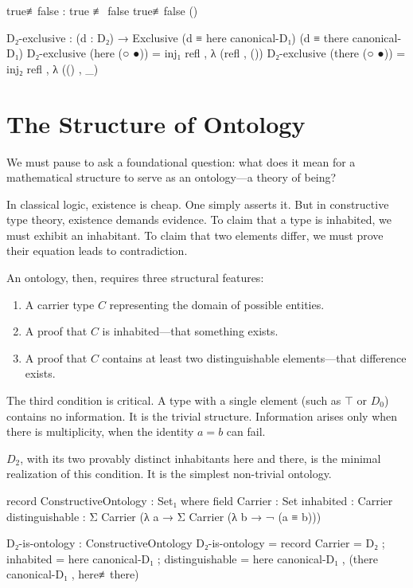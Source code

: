 \documentclass[11pt,a4paper]{book}
\def\texttt#1{#1}%
\begin{document}
\begin{code}
true≢false : true ≢ false
true≢false ()
\end{code}

\begin{code}
D₂-exclusive : (d : D₂) → Exclusive (d ≡ here canonical-D₁) (d ≡ there canonical-D₁)
D₂-exclusive (here (○ ●)) = inj₁ refl , λ { (refl , ()) }
D₂-exclusive (there (○ ●)) = inj₂ refl , λ { (() , _) }

\end{code}

\section{The Structure of Ontology}

We must pause to ask a foundational question: what does it mean for a mathematical 
structure to serve as an ontology—a theory of being?

In classical logic, existence is cheap. One simply asserts it. But in constructive 
type theory, existence demands evidence. To claim that a type is inhabited, we must 
exhibit an inhabitant. To claim that two elements differ, we must prove their 
equation leads to contradiction.

An ontology, then, requires three structural features:
\begin{enumerate}
\item A carrier type $C$ representing the domain of possible entities.
\item A proof that $C$ is inhabited—that something exists.
\item A proof that $C$ contains at least two distinguishable elements—that difference exists.
\end{enumerate}

The third condition is critical. A type with a single element (such as $\top$ or $D_0$) 
contains no information. It is the trivial structure. Information arises only when 
there is multiplicity, when the identity $a = b$ can fail.

$D_2$, with its two provably distinct inhabitants \texttt{here} and \texttt{there}, 
is the minimal realization of this condition. It is the simplest non-trivial ontology.

\begin{code}
record ConstructiveOntology : Set₁ where
  field
    Carrier : Set
    inhabited : Carrier
    distinguishable : Σ Carrier (λ a → Σ Carrier (λ b → ¬ (a ≡ b)))

D₂-is-ontology : ConstructiveOntology
D₂-is-ontology = record
  { Carrier = D₂
  ; inhabited = here canonical-D₁
  ; distinguishable = here canonical-D₁ , (there canonical-D₁ , here≢there)
  }
\end{code}
\end{document}
